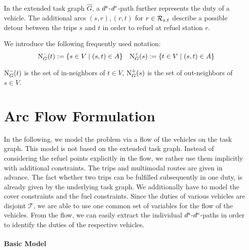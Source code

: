 In the extended task graph $\widehat{G}$, a $d^{\operatorname{s}}$-$d^{\operatorname{e}}$-path further represents the duty of a vehicle. The additional arcs $(s,r),(r,t)$ for $r\in\mathcal{R}_{s,t}$ describe a possible detour between the trips $s$ and $t$ in order to refuel at refuel station $r$.

We introduce the following frequently used notation:
\begin{align*}
	\operatorname{N}_G^-(t) := \left\{s\in V\mid (s,t)\in A\right\} && \operatorname{N}_G^+(s) := \left\{t\in V\mid (s,t)\in A\right\}
\end{align*}

$\operatorname{N}_G^-(t)$ is the set of in-neighbors of $t\in V$, $\operatorname{N}_G^+(s)$ is the set of out-neighbors of $s\in V$.


\section{Arc Flow Formulation}
\label{sec:arcflow_formulation}

In the following, we model the problem via a flow of the vehicles on the task graph. This model is not based on the extended task graph. Instead of considering the refuel points explicitly in the flow, we rather use them implicitly with additional constraints. The trips and multimodal routes are given in advance. The fact whether two trips can be fulfilled subsequently in one duty, is already given by the underlying task graph. We additionally have to model the cover constraints and the fuel constraints. Since the duties of various vehicles are disjoint \wrt $\mathcal{T}$, we are able to use one common set of variables for the flow of the vehicles. From the flow, we can easily extract the individual $d^{\operatorname{s}}$-$d^{\operatorname{e}}$-paths in order to identify the duties of the respective vehicles.

\paragraph{Basic Model} \parfill

